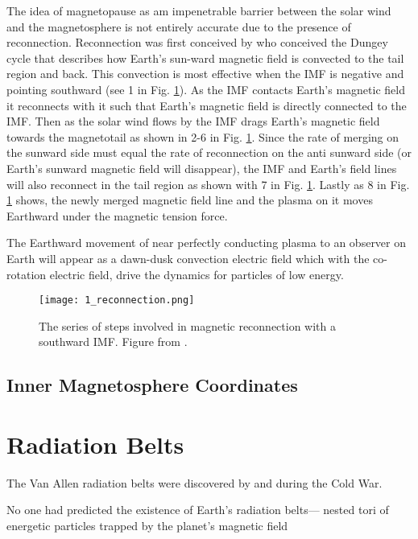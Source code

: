 The idea of magnetopause as am impenetrable barrier between the solar wind and the magnetosphere is not entirely accurate due to the presence of reconnection. Reconnection was first conceived by \citet{Dungey1961} who conceived the Dungey cycle that describes how Earth's sun-ward magnetic field is convected to the tail region and back. This convection is most effective when the IMF is negative and pointing southward (see 1 in Fig. \ref{Intro:reconnection}). As the IMF contacts Earth's magnetic field it reconnects with it such that Earth's magnetic field is directly connected to the IMF. Then as the solar wind flows by the IMF drags Earth's magnetic field towards the magnetotail as shown in 2-6 in Fig. \ref{Intro:reconnection}. Since the rate of merging on the sunward side must equal the rate of reconnection on the anti sunward side (or Earth's sunward magnetic field will disappear), the IMF and Earth's field lines will also reconnect in the tail region as shown with 7 in Fig. \ref{Intro:reconnection}. Lastly as 8 in Fig. \ref{Intro:reconnection} shows, the newly merged magnetic field line and the plasma on it moves Earthward under the magnetic tension force.

The Earthward movement of near perfectly conducting plasma to an observer on Earth will appear as a dawn-dusk convection electric field which with the co-rotation electric field, drive the dynamics for particles of low energy.

\begin{figure}
\texttt{[image: 1\_reconnection.png]}
\caption{The series of steps involved in magnetic reconnection with a southward IMF. Figure from \citet{Baumjohann1997}.}
\label{Intro:reconnection}
\end{figure}

\subsection{Inner Magnetosphere Coordinates}\label{Intro:coords}

\section{Radiation Belts}\label{Intro:radiation_belt}
The Van Allen radiation belts were discovered by \citet{Allen1959} and \citet{Vernov1960} during the Cold War.

 No one had predicted the
existence of Earth’s radiation belts—
nested tori of energetic particles trapped
by the planet’s magnetic field


